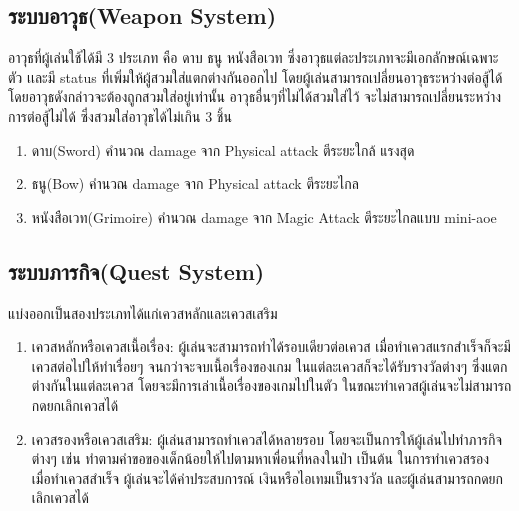 \subsection{ระบบอาวุธ(Weapon System)}
อาวุธที่ผู้เล่นใช้ได้มี 3 ประเภท คือ ดาบ ธนู หนังสือเวท ซึ่งอาวุธแต่ละประเภทจะมีเอกลักษณ์เฉพาะตัว เเละมี status ที่เพิ่มให้ผู้สวมใส่แตกต่างกันออกไป โดยผู้เล่นสามารถเปลี่ยนอาวุธระหว่างต่อสู้ได้ โดยอาวุธดังกล่าวจะต้องถูกสวมใส่อยู่เท่านั้น อาวุธอื่นๆที่ไม่ได้สวมใส่ไว้ จะไม่สามารถเปลี่ยนระหว่างการต่อสู้ไม่ได้ ซึ่งสวมใส่อาวุธได้ไม่เกิน 3 ชิ้น

\begin{enumerate}
\item ดาบ(Sword) คำนวณ damage จาก Physical attack ตีระยะใกล้ แรงสุด
\item ธนู(Bow) คำนวณ damage จาก Physical attack ตีระยะไกล
\item หนังสือเวท(Grimoire) คำนวณ damage  จาก Magic Attack ตีระยะไกลแบบ mini-aoe~\cite{aoe}
\end{enumerate}

\subsection{ระบบภารกิจ(Quest System)}
แบ่งออกเป็นสองประเภทได้แก่เควสหลักและเควสเสริม
\begin{enumerate}
\item เควสหลักหรือเควสเนื้อเรื่อง:  ผู้เล่นจะสามารถทำได้รอบเดียวต่อเควส เมื่อทำเควสแรกสำเร็จก็จะมีเควสต่อไปให้ทำเรื่อยๆ จนกว่าจะจบเนื้อเรื่องของเกม ในแต่ละเควสก็จะได้รับรางวัลต่างๆ ซึ่งแตกต่างกันในแต่ละเควส โดยจะมีการเล่าเนื้อเรื่องของเกมไปในตัว ในขณะทำเควสผู้เล่นจะไม่สามารถกดยกเลิกเควสได้
\item เควสรองหรือเควสเสริม: ผู้เล่นสามารถทำเควสได้หลายรอบ โดยจะเป็นการให้ผู้เล่นไปทำภารกิจต่างๆ เช่น ทำตามคำขอของเด็กน้อยให้ไปตามหาเพื่อนที่หลงในป่า เป็นต้น ในการทำเควสรอง เมื่อทำเควสสำเร็จ ผู้เล่นจะได้ค่าประสบการณ์ เงินหรือไอเทมเป็นรางวัล และผู้เล่นสามารถกดยกเลิกเควสได้
\end{enumerate}

